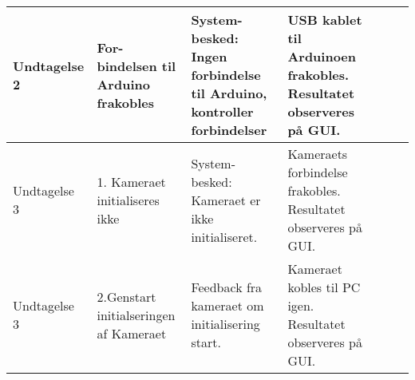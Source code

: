\begin{center}
\begin{longtable}{ | m{1.785cm} | m{1.785cm}| m{1.785cm}| m{1.785cm}| m{1.785cm}| m{1.785cm}|m{1.785cm}| }
			
			Undtagelse 2 & For-bindelsen til Arduino frakobles  & System-besked:  Ingen forbindelse til Arduino, kontroller forbindelser & USB kablet til Arduinoen frakobles. Resultatet observeres på GUI.  &  & & \\
			\hline

		Undtagelse 3 & 1. Kameraet initialiseres ikke & System-besked: Kameraet er ikke initialiseret. & Kameraets forbindelse frakobles. Resultatet observeres på GUI.  &  & & \\
			\hline
		
		Undtagelse 3 & 2.Genstart initialseringen af Kameraet & Feedback fra kameraet om initialisering start. & Kameraet kobles til PC igen. Resultatet observeres på GUI.  &  & & \\
			\hline
			
		\end{longtable}
		
	\end{center}
	\pagebreak